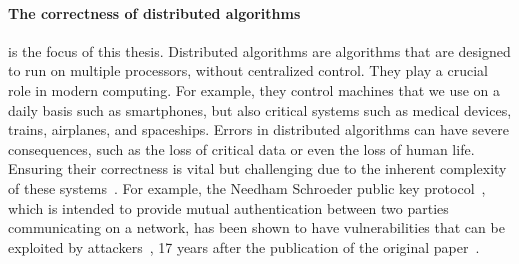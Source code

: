 
\paragraph{The correctness of distributed algorithms} is the focus of this thesis. Distributed algorithms
are algorithms that are designed to run on multiple processors, without centralized control. They play a crucial role in modern computing.
For example, they control machines that we use on a daily basis such as smartphones, but also critical systems such as medical devices, trains, airplanes, and spaceships. Errors in distributed algorithms can have severe consequences, such as the loss of critical data or even the loss of human life. Ensuring their correctness is vital but challenging due to the inherent complexity of these systems~\cite{heiser2010theroad, lamport2019thebyzantine}. For example, the Needham Schroeder public key protocol~\cite{needham1978using}, which is intended to provide mutual authentication between two parties communicating on a network, has been shown to have vulnerabilities that can be exploited by attackers~\cite{lowe1996breaking}, 17 years after the publication of the original paper~\cite{cortier2014formal}.



